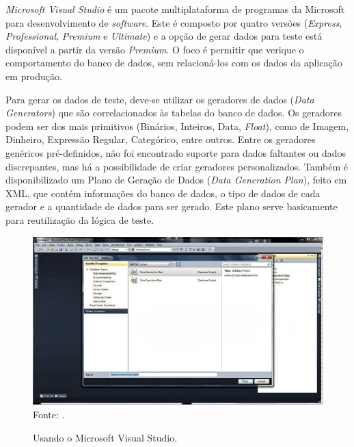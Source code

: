 \documentclass[
	12pt,				%
	openright,			%
	oneside,			%
	a4paper,			%
	english,			%
	brazil				%
	]{abntex2}
\begin{document}
		\emph{Microsoft Visual Studio} \cite{VSDataGenerator} é um pacote multiplataforma de programas da Microsoft para desenvolvimento de \emph{software}. 
		Este é composto por quatro versões (\emph{Express}, \emph{Professional}, \emph{Premium} e \emph{Ultimate}) e a opção de gerar dados para teste está disponível a partir da versão \emph{Premium}.
		O foco é permitir que verique o comportamento do banco de dados, sem relacioná-los com os dados da aplicação em produção.
		\par
		Para gerar os dados de teste, deve-se utilizar os geradores de dados (\emph{Data Generators}) que são correlacionados às tabelas do banco de dados.
			Os geradores podem ser dos mais primitivos (Binários, Inteiros, Data, \emph{Float}), como de Imagem, Dinheiro, Expressão Regular, Categórico, entre outros.
		Entre os geradores genéricos pré-definidos, não foi encontrado suporte para dados faltantes ou dados discrepantes, mas há a possibilidade de criar geradores personalizados.
		Também é disponibilizado um Plano de Geração de Dados (\emph{Data Generation Plan}), feito em XML, que contém informações do banco de dados, o tipo de dados de cada gerador e a quantidade de dados para ser gerado. 
		Este plano serve basicamente para reutilização da lógica de teste.
		\begin{figure}[h]
			\centering
			\caption{Usando o Microsoft Visual Studio.}
			\includegraphics[width=\linewidth]{./figures/TrabalhosRelacionados/Visual-Studio.jpg}
			\label{fig:VSDG}
			\footnotesize Fonte: \cite{VSDataGenerator}.
		\end{figure}
\end{document}
